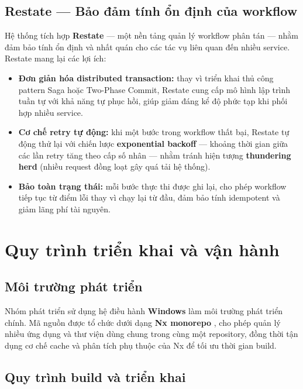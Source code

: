 \subsection{Restate --- Bảo đảm tính ổn định của workflow}

Hệ thống tích hợp \textbf{Restate} \cite{restate_docs} --- một nền tảng quản lý workflow phân tán --- nhằm đảm bảo tính ổn định và nhất quán cho các tác vụ liên quan đến nhiều service. Restate mang lại các lợi ích:

\begin{itemize}
    \item \textbf{Đơn giản hóa distributed transaction:} thay vì triển khai thủ công pattern Saga hoặc Two-Phase Commit, Restate cung cấp mô hình lập trình tuần tự với khả năng tự phục hồi, giúp giảm đáng kể độ phức tạp khi phối hợp nhiều service.
    \item \textbf{Cơ chế retry tự động:} khi một bước trong workflow thất bại, Restate tự động thử lại với chiến lược \textbf{exponential backoff} --- khoảng thời gian giữa các lần retry tăng theo cấp số nhân --- nhằm tránh hiện tượng \textbf{thundering herd} (nhiều request đồng loạt gây quá tải hệ thống).
    \item \textbf{Bảo toàn trạng thái:} mỗi bước thực thi được ghi lại, cho phép workflow tiếp tục từ điểm lỗi thay vì chạy lại từ đầu, đảm bảo tính idempotent và giảm lãng phí tài nguyên.
\end{itemize}

\section{Quy trình triển khai và vận hành}

\subsection{Môi trường phát triển}

Nhóm phát triển sử dụng hệ điều hành \textbf{Windows} làm môi trường phát triển chính. Mã nguồn được tổ chức dưới dạng \textbf{Nx monorepo} \cite{nx_monorepo}, cho phép quản lý nhiều ứng dụng và thư viện dùng chung trong cùng một repository, đồng thời tận dụng cơ chế cache và phân tích phụ thuộc của Nx để tối ưu thời gian build.

\subsection{Quy trình build và triển khai}


